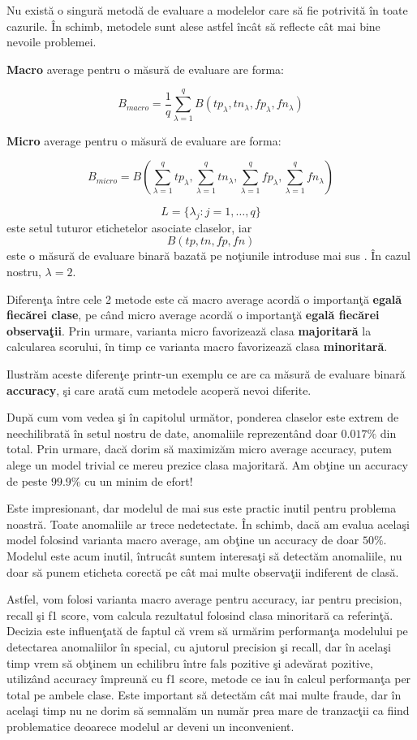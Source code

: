 Nu există o singură metodă de evaluare a modelelor care să fie potrivită în toate 
cazurile. În schimb, metodele sunt alese astfel încât să reflecte cât mai bine 
nevoile problemei.

\textbf{Macro} average pentru o măsură de evaluare are forma:

\begin{equation}
    B_{macro}=\frac{1}{q} \sum_{\lambda=1}^{q} B(tp_{\lambda}, tn_{\lambda}, fp_{\lambda},
fn_{\lambda})
\end{equation}

\textbf{Micro} average pentru o măsură de evaluare are forma:

\begin{equation}
    B_{micro}=B(\sum_{\lambda=1}^{q} tp_{\lambda}, \sum_{\lambda=1}^{q} tn_{\lambda}, 
\sum_{\lambda=1}^{q} fp_{\lambda}, \sum_{\lambda=1}^{q} fn_{\lambda})
\end{equation}

$$L=\{\lambda_{j}: j=1,\dots,q \}$$ 
este setul tuturor etichetelor asociate claselor, iar 
$$B(tp, tn, fp, fn)$$ este o măsură de evaluare binară bazată pe noţiunile introduse mai sus
\cite{Asch2013MacroandME}.
În cazul nostru, $\lambda=2$.


Diferenţa între cele 2 metode este că macro average acordă o importanţă 
\textbf{egală fiecărei 
clase}, pe când micro average acordă o importanţă 
\textbf{egală fiecărei observaţii}. Prin urmare,
varianta micro favorizează clasa 
\textbf{majoritară} la calcularea scorului, în timp ce varianta 
macro favorizează clasa \textbf{minoritară}.

Ilustrăm aceste diferenţe printr-un exemplu ce are ca măsură de evaluare binară 
\textbf{accuracy},
şi care arată cum metodele acoperă nevoi diferite.

După cum vom vedea şi în capitolul următor, 
ponderea claselor este extrem de neechilibrată în setul nostru de date, anomaliile 
reprezentând doar $0.017\%$ din total. Prin urmare, dacă dorim să maximizăm 
micro average accuracy, putem alege un model trivial ce mereu prezice clasa majoritară.
Am obţine un accuracy de peste $99.9\%$ cu un minim de efort!

Este impresionant, dar modelul de mai sus este practic inutil pentru problema noastră.
Toate anomaliile ar trece nedetectate. În schimb, dacă am evalua acelaşi model folosind
varianta macro average, am obţine un accuracy de doar $50\%$. Modelul este acum inutil,
întrucât suntem interesaţi să detectăm anomaliile, nu doar să punem eticheta corectă 
pe cât mai multe observaţii indiferent de clasă.

Astfel, vom folosi varianta macro average pentru accuracy, iar pentru precision, recall şi 
f1 score, vom calcula rezultatul folosind clasa minoritară ca referinţă. Decizia este influenţată
de faptul că vrem să urmărim performanţa modelului pe detectarea anomaliilor în special, cu ajutorul
precision şi recall, dar în acelaşi timp vrem să obţinem un echilibru între fals pozitive şi 
adevărat pozitive, utilizând accuracy împreună cu f1 score, metode ce iau în calcul performanţa 
per total pe ambele clase. Este important să detectăm cât mai multe fraude, dar în acelaşi timp 
nu ne dorim să semnalăm un număr prea mare de tranzacţii ca fiind problematice deoarece modelul 
ar deveni un inconvenient.
